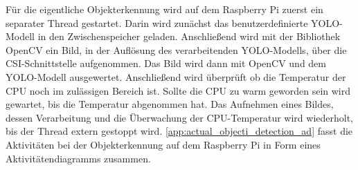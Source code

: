 Für die eigentliche Objekterkennung wird auf dem Raspberry Pi zuerst ein separater Thread gestartet.
Darin wird zunächst das benutzerdefinierte \ac{YOLO}-Modell in den Zwischenspeicher geladen.
Anschließend wird mit der Bibliothek OpenCV ein Bild, in der Auflösung des verarbeitenden \ac{YOLO}-Modells, über die \ac{CSI}-Schnittstelle aufgenommen.
Das Bild wird dann mit OpenCV und dem \ac{YOLO}-Modell ausgewertet.
Anschließend wird überprüft ob die Temperatur der \ac{CPU} noch im zulässigen Bereich ist.
Sollte die \ac{CPU} zu warm geworden sein wird gewartet, bis die Temperatur abgenommen hat.
Das Aufnehmen eines Bildes, dessen Verarbeitung und die Überwachung der \ac{CPU}-Temperatur wird wiederholt, bis der Thread extern gestoppt wird.
\autoref{app:actual_objecti_detection_ad} fasst die Aktivitäten bei der Objekterkennung auf dem Raspberry Pi in Form eines Aktivitätendiagramms zusammen.